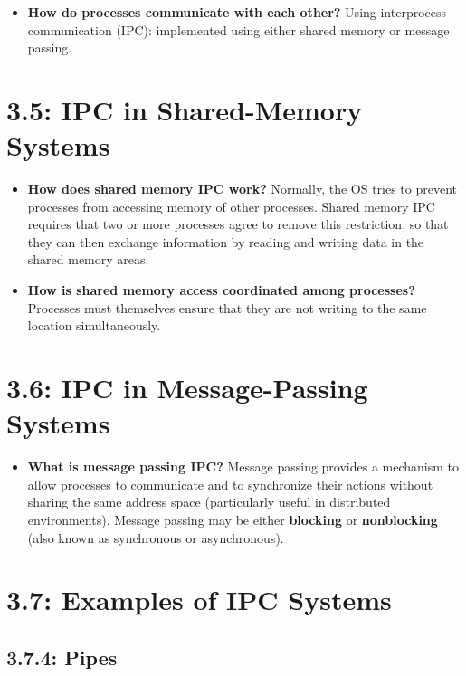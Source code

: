 \documentclass[12pt]{article}
\begin{document}
\begin{itemize}
    \item \textbf{How do processes communicate with each other?} Using interprocess communication (IPC): implemented using either shared memory or message passing.
\end{itemize}

\section*{3.5: IPC in Shared-Memory Systems}

\begin{itemize}
    \item \textbf{How does shared memory IPC work?} Normally, the OS tries to prevent processes from accessing memory of other processes. Shared memory IPC requires that two or more processes agree to remove this restriction, so that they can then exchange information by reading and writing data in the shared memory areas.
    \item \textbf{How is shared memory access coordinated among processes?} Processes must themselves ensure that they are not writing to the same location simultaneously.
\end{itemize}

\section*{3.6: IPC in Message-Passing Systems}

\begin{itemize}
    \item \textbf{What is message passing IPC?} Message passing provides a mechanism to allow processes to communicate and to synchronize their actions without sharing the same address space (particularly useful in distributed environments). Message passing may be either \textbf{blocking} or \textbf{nonblocking} (also known as synchronous or asynchronous).
\end{itemize}

\section*{3.7: Examples of IPC Systems}

\subsection*{3.7.4: Pipes}
\end{document}
